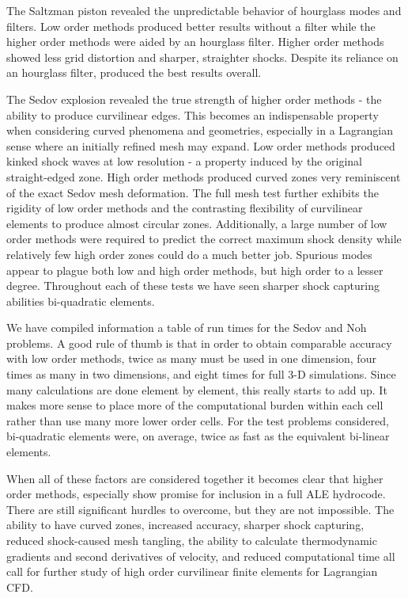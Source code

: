 The Saltzman piston revealed the unpredictable behavior of hourglass modes and filters. Low order methods produced better results without a filter while the higher order methods were aided by an hourglass filter. Higher order methods showed less grid distortion and sharper, straighter shocks. Despite its reliance on an hourglass filter,  produced the best results overall.

The Sedov explosion revealed the true strength of higher order methods - the ability to produce curvilinear edges. This becomes an indispensable property when considering curved phenomena and geometries, especially in a Lagrangian sense where an initially refined mesh may expand. Low order methods produced kinked shock waves at low resolution - a property induced by the original straight-edged zone. High order methods produced curved zones very reminiscent of the exact Sedov mesh deformation. The full mesh test further exhibits the rigidity of low order methods and the contrasting flexibility of curvilinear elements to produce almost circular zones. Additionally, a large number of low order methods were required to predict the correct maximum shock density while relatively few high order zones could do a much better job. Spurious modes appear to plague both low and high order methods, but high order to a lesser degree. Throughout each of these tests we have seen sharper shock capturing abilities bi-quadratic elements.

We have compiled information a table of run times for the Sedov and Noh problems. A good rule of thumb is that in order to obtain comparable accuracy with low order methods, twice as many must be used in one dimension, four times as many in two dimensions, and eight times for full 3-D simulations. Since many calculations are done element by element, this really starts to add up. It makes more sense to place more of the computational burden within each cell rather than use many more lower order cells. For the test problems considered, bi-quadratic elements were, on average, twice as fast as the equivalent bi-linear elements. 

When all of these factors are considered together it becomes clear that higher order methods, especially  show promise for inclusion in a full ALE hydrocode. There are still significant hurdles to overcome, but they are not impossible. The ability to have curved zones, increased accuracy, sharper shock capturing, reduced shock-caused mesh tangling, the ability to calculate thermodynamic gradients and second derivatives of velocity, and reduced computational time all call for further study of high order curvilinear finite elements for Lagrangian CFD.  